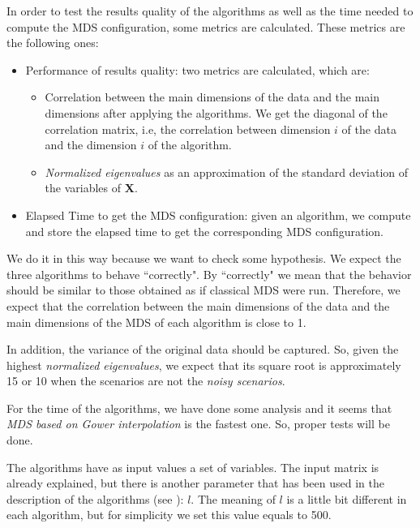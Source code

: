 \documentclass[11pt]{report}
\begin{document}
\indent In order to test the results quality of the algorithms as well as 
the time needed to compute the MDS configuration, some metrics are calculated. 
These metrics are the following ones:

\begin{itemize}
\item Performance of results quality: two metrics are calculated, which are:
\begin{itemize}


\item Correlation between the main dimensions of the data and the
main dimensions after applying the algorithms. We get the diagonal of the 
correlation matrix, i.e, the correlation between dimension $i$ of the data 
and the dimension $i$ of the algorithm. 

\item \textit{Normalized eigenvalues} as an approximation of the standard 
deviation of the variables of \textbf{X}.
\end{itemize}

\item Elapsed Time to get the MDS configuration: given an algorithm, we compute 
and store the elapsed time to get the corresponding MDS configuration.

\end{itemize}

\indent We do it in this way because we want to check some hypothesis. We 
expect the three algorithms to behave ``correctly". By ``correctly" we mean 
that the behavior should be similar to those obtained as if classical MDS 
were run. Therefore, we expect that the correlation between the main 
dimensions of the data and the main dimensions of the MDS of each algorithm 
is close to 1.

\indent In addition, the variance of the original data should be captured. 
So, given the highest \textit{normalized eigenvalues}, we expect that 
its square root is approximately 15 or 10 when the scenarios are not the 
\textit{noisy scenarios}. 

\indent For the time of the algorithms, we have done some analysis and it seems 
that \textit{MDS based on Gower interpolation} is the fastest one.
So, proper tests will be done.


\indent The algorithms have as input values a set of variables. The input matrix 
is already explained, but there is another parameter that has been used in 
the description of the algorithms (see ): $l$. The meaning of 
$l$ is a little bit different in each algorithm, but for simplicity we 
set this value equals to 500. 
\end{document}
